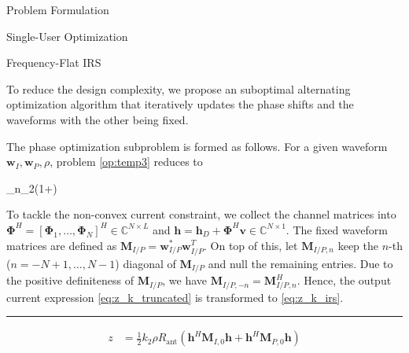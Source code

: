 \documentclass{IEEEtran}
\begin{document}
\begin{section}{Problem Formulation}
\begin{subsection}{Single-User Optimization}
\begin{subsubsection}{Frequency-Flat IRS}
\begin{maxi}
			\end{maxi}
			To reduce the design complexity, we propose an suboptimal alternating optimization algorithm that iteratively updates the phase shifts and the waveforms with the other being fixed.

			The phase optimization subproblem is formed as follows. For a given waveform $\boldsymbol{w}_I,\boldsymbol{w}_P,\rho$, problem \ref{op:temp3} reduces to
			\begin{maxi}
				{}{\sum_{n}{\log_2\left(1+\right)}}{\label{op:temp4}}{}
			\end{maxi}
			To tackle the non-convex current constraint, we collect the channel matrices into $\boldsymbol{\Phi}^H=[\boldsymbol{\Phi}_1,\dots,\boldsymbol{\Phi}_N]^H \in \mathbb{C}^{N \times L}$ and $\boldsymbol{h}=\boldsymbol{h}_D+\boldsymbol{\Phi}^H\boldsymbol{v} \in \mathbb{C}^{N \times 1}$. The fixed waveform matrices are defined as $\boldsymbol{M}_{I/P}=\boldsymbol{w}_{I/P}^*\boldsymbol{w}_{I/P}^T$. On top of this, let $\boldsymbol{M}_{I/P, n}$ keep the $n$-th ($n=-N+1,\dots,N-1$) diagonal of $\boldsymbol{M}_{I/P}$ and null the remaining entries. Due to the positive definiteness of $\boldsymbol{M}_{I/P}$, we have $\boldsymbol{M}_{I/P,-n}=\boldsymbol{M}_{I/P,n}^H$. Hence, the output current expression \ref{eq:z_k_truncated} is transformed to \ref{eq:z_k_irs}.
			\begin{figure*}[b]
				\hrule
				\begin{equation}\label{eq:z_k_irs}
					\begin{split}
						z
						&=\frac{1}{2}{k_2}{\rho}{R_{\text{ant}}}(\boldsymbol{h}^H\boldsymbol{M}_{I,0}\boldsymbol{h}+\boldsymbol{h}^H\boldsymbol{M}_{P,0}\boldsymbol{h})\\

\end{split}
\end{equation}
\end{figure*}
\end{subsubsection}
\end{subsection}
\end{section}
\end{document}
